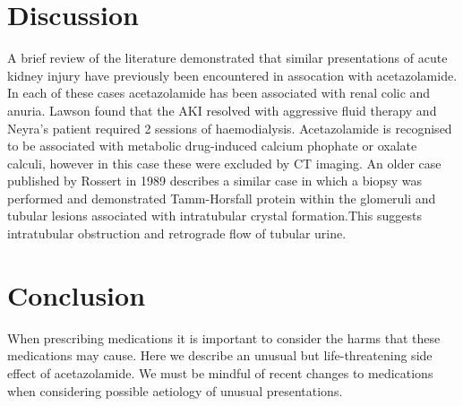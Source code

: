 \documentclass[11pt, ]{article}
\begin{document}
\section*{Discussion}
A brief review of the literature demonstrated that similar presentations of acute kidney injury have previously been encountered in assocation with acetazolamide\cite{Neyra2014, Rossert1984, Lawson2020}. In each of these cases acetazolamide has been associated with renal colic and anuria. Lawson found that the AKI resolved with aggressive fluid therapy and Neyra's patient required 2 sessions of haemodialysis. Acetazolamide is recognised to be associated with metabolic drug-induced calcium phophate or oxalate calculi, however in this case these were excluded by CT imaging. An older case published by Rossert in 1989 describes a similar case in which a biopsy was performed and demonstrated Tamm-Horsfall protein within the glomeruli and tubular lesions associated with intratubular crystal formation.This suggests intratubular obstruction and retrograde flow of tubular urine\cite{Rossert1984}.  

\section*{Conclusion}
When prescribing medications it is important to consider the harms that these medications may cause. Here we describe an unusual but life-threatening side effect of acetazolamide. We must be mindful of recent changes to medications when considering possible aetiology of unusual presentations.


\printbibliography
\end{document}
